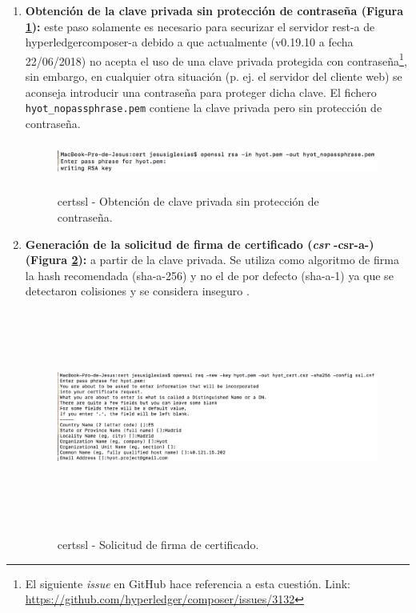 \documentclass[12pt,a4paper, twoside]{report}
\begin{document}
\begin{enumerate}
		\item \textbf{Obtención de la clave privada sin protección de contraseña (Figura \ref{fig:cert_keynopassphrase}):} este paso solamente es necesario para securizar el servidor \gls{rest-a} de \gls{hyperledgercomposer-a} debido a que actualmente (v0.19.10 a fecha 22/06/2018) no acepta el uso de una clave privada protegida con contraseña\footnote{El siguiente \textit{issue} en GitHub hace referencia a esta cuestión. Link: \url{https://github.com/hyperledger/composer/issues/3132}}, sin embargo, en cualquier otra situación (p. ej. el servidor del cliente web) se aconseja introducir una contraseña para proteger dicha clave. El fichero \texttt{hyot\_nopassphrase.pem} contiene la clave privada pero sin protección de contraseña.
				
			\begin{figure}[!ht]   
				\caption{\Gls{certssl} - Obtención de clave privada sin protección de contraseña.} 
				\begin{center} 
	 				\includegraphics[width=17cm,height=1.2cm]{Images/installationManual/cert/key_nopassphrase.png} \\
					\label{fig:cert_keynopassphrase} 
				\end{center}  
			\end{figure}
			
		\item \textbf{Generación de la solicitud de firma de certificado (\textit{\gls{csr}} -\gls{csr-a}-) (Figura \ref{fig:cert_csr}):} a partir de la clave privada. Se utiliza como algoritmo de firma la \gls{hash} recomendada (\gls{sha-a}-256) y no el de por defecto (\gls{sha-a}-1) ya que se detectaron colisiones y se considera inseguro \cite{madhuravani:CHF}. 
 		
			\begin{figure}[!ht]   
				\caption{\Gls{certssl} - Solicitud de firma de certificado.} 
				\begin{center} 
	 				\includegraphics[width=19cm,height=7cm]{Images/installationManual/cert/cert_csr.png} \\
					\label{fig:cert_csr} 
				\end{center}  
			\end{figure}
		

\end{enumerate}
\end{document}
